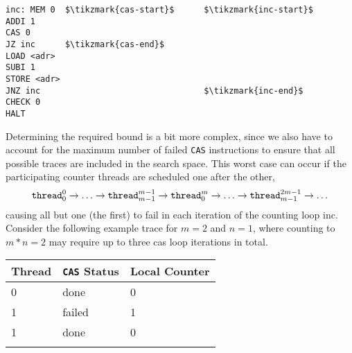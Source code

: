 \begin{minipage}{\textwidth}
\begin{lstlisting}[style=asm, caption={\CHANGE{Valid} counter template.}, label={lst:count:cas}, mathescape, xleftmargin=0.39\textwidth]
inc: MEM 0  $\tikzmark{cas-start}$      $\tikzmark{inc-start}$
ADDI 1
CAS 0
JZ inc      $\tikzmark{cas-end}$
LOAD <adr>
SUBI 1
STORE <adr>
JNZ inc                                 $\tikzmark{inc-end}$
CHECK 0
HALT
\end{lstlisting}
\end{minipage}

Determining the required bound is a bit more complex, since we also have to account for the maximum number of failed \lstinline[style=asm]{CAS} instructions to ensure that all possible traces are included in the search space.
This worst case can occur if the participating counter threads are scheduled one after the other,
\[
  \texttt{thread}^0_0 \rightarrow \ldots \rightarrow \texttt{thread}^{m - 1}_{m - 1} \rightarrow \texttt{thread}^m_0 \rightarrow \ldots \rightarrow \texttt{thread}^{2m - 1}_{m - 1} \rightarrow \ldots
\]
causing all but one (the first) to fail in each iteration of the counting loop {\color{red!60!black}\textsf{inc}}.
Consider the following example trace
for $m = 2$ and $n = 1$,
where counting to $m * n = 2$ may require up to
three {\color{red!60!black}\textsf{cas}} loop iterations in total.
\begin{center}
  \begin{tabu}{lll}
    Thread & \lstinline[style=asm]{CAS} Status & Local Counter \\
     & done & 0 \\
    1 & failed & 1 \\
    \hline
     & done & 0 \\
    \lasthline
  \end{tabu}
\end{center}
